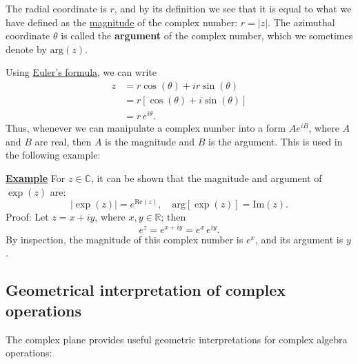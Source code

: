 \documentclass[10pt,a4paper]{article}
\begin{document}
\noindent
The radial coordinate is $r$, and by its definition we see that it is
equal to what we have defined as the
\hyperref[magnitudes-and-conjugates]{magnitude} of the complex number:
$r = |z|$. The azimuthal coordinate $\theta$ is called the
\textbf{argument} of the complex number, which we sometimes denote by
$\mathrm{arg}(z)$.

Using \hyperref[eulers-formula]{Euler's formula}, we can write
\begin{align}
  z &= r\cos(\theta) + i r\sin(\theta)\\
  &= r \left[\cos(\theta) + i \sin(\theta)\right] \\
  &= r \, e^{i\theta}.
\end{align}
Thus, whenever we can manipulate a complex number into a form $A
e^{iB}$, where $A$ and $B$ are real, then $A$ is the magnitude and $B$
is the argument. This is used in the following example:

\begin{framed}
\noindent
\underline{\textbf{Example}}
\vskip 0.1in \noindent
For $z \in \mathbb{C}$, it can be shown that the magnitude and argument
of $\exp(z)$ are:
\begin{equation}
  \left|\exp(z)\right| = e^{\mathrm{Re}(z)}, \quad
  \mathrm{arg}\left[\exp(z)\right] = \mathrm{Im}(z).
\end{equation}
Proof: Let $z = x + i y$, where $x, y \in \mathbb{R}$; then
\begin{equation}
  e^{z} = e^{x + i y} = e^x \, e^{iy}.
\end{equation}
By inspection, the magnitude of this complex number is $e^x$, and its
argument is $y$.
\end{framed}

\subsection{Geometrical interpretation of complex operations}
\label{geometrical-interpretation-of-complex-operations}

The complex plane provides useful geometric interpretations for
complex algebra operations:
\end{document}
